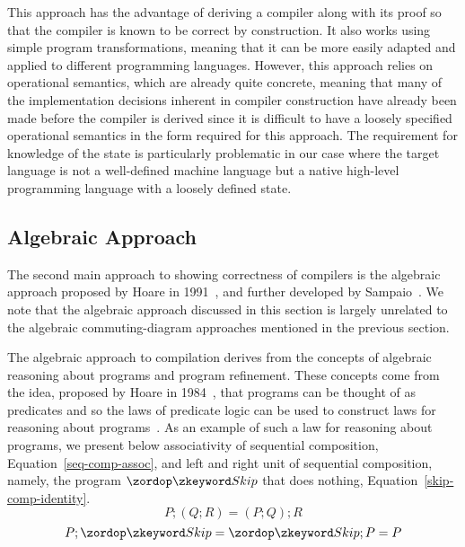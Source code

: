 \documentclass[a4paper,10pt]{report}
\begin{document}
This approach has the advantage of deriving a compiler along with its
proof so that the compiler is known to be correct by construction.
It also works using simple program transformations, meaning that it
can be more easily adapted and applied to different programming languages.
However, this approach relies on operational semantics, which are
already quite concrete, meaning that many of the implementation
decisions inherent in compiler construction have already been made
before the compiler is derived since it is difficult to have a loosely
specified operational semantics in the form required for this approach.
The requirement for knowledge of the state is particularly problematic
in our case where the target language is not a well-defined machine
language but a native high-level programming language with a loosely
defined state. 

\subsection{Algebraic Approach}
\label{algebraic-approach-subsection}

The second main approach to showing correctness of compilers is the
algebraic approach proposed by Hoare in 1991~\cite{hoare1991}, and
further developed by Sampaio~\cite{hoare1993, sampaio1993,
  sampaio1997}.
We note that the algebraic approach discussed in this section is
largely unrelated to the algebraic commuting-diagram approaches
mentioned in the previous section.

The algebraic approach to compilation derives from the concepts of
algebraic reasoning about programs and program refinement.
These concepts come from the idea, proposed by Hoare in
1984~\cite{hoare1984}, that programs can be thought of as predicates
and so the laws of predicate logic can be used to construct laws for
reasoning about programs~\cite{hoare1987}.
As an example of such a law for reasoning about programs, we present
below associativity of sequential composition,
Equation~\eqref{seq-comp-assoc}, and left and right unit of sequential
composition, namely, the program $\Skip$ that does nothing,
Equation~\eqref{skip-comp-identity}.
\begin{equation}
  \label{seq-comp-assoc}
  P;(Q;R) = (P;Q);R
\end{equation}
\begin{equation}
  \label{skip-comp-identity}
  P;\Skip = \Skip;P = P
\end{equation}
\end{document}

